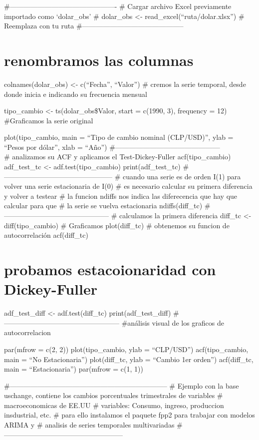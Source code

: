 \documentclass[
]{article}
\begin{document}
\#---------------------------------------------- \# Cargar archivo Excel
previamente importado como `dolar\_obs' \# dolar\_obs \textless-
read\_excel(``ruta/dolar.xlsx'') \# Reemplaza con tu ruta
\#--------------------------------------------

\section{renombramos las columnas}\label{renombramos-las-columnas}

colnames(dolar\_obs) \textless- c(``Fecha'', ``Valor'') \# cremos la
serie temporal, desde donde inicia e indicando su frecuencia mensual

tipo\_cambio \textless- ts(dolar\_obs\$Valor, start = c(1990, 3),
frequency = 12) \#Graficamos la serie original

plot(tipo\_cambio, main = ``Tipo de cambio nominal (CLP/USD)'', ylab =
``Pesos por dólar'', xlab = ``Año'')
\#---------------------------------------------\\
\# analizamos su ACF y aplicamos el Test-Dickey-Fuller acf(tipo\_cambio)
adf\_test\_tc \textless- adf.test(tipo\_cambio) print(adf\_test\_tc)
\#----------------------------------------------- \# cuando una serie es
de orden I(1) para volver una serie estacionaria de I(0) \# es necesario
calcular su primera diferencia y volver a testear \# la funcion ndiffs
nos indica las diferecencia que hay que calcular para que \# la serie se
vuelva estacionaria ndiffs(diff\_tc)
\#--------------------------------------------- \# calculamos la primera
diferencia diff\_tc \textless- diff(tipo\_cambio) \# Graficamos
plot(diff\_tc) \# obtenemos su funcion de autocorrelación acf(diff\_tc)

\section{probamos estacoionaridad con
Dickey-Fuller}\label{probamos-estacoionaridad-con-dickey-fuller}

adf\_test\_diff \textless- adf.test(diff\_tc) print(adf\_test\_diff)
\#-------------------------------------------------- \#análisis visual
de los graficos de autocorrelacion

par(mfrow = c(2, 2)) plot(tipo\_cambio, ylab = ``CLP/USD'')
acf(tipo\_cambio, main = ``No Estacionaria'') plot(diff\_tc, ylab =
``Cambio 1er orden'') acf(diff\_tc, main = ``Estacionaria'') par(mfrow =
c(1, 1))

\#--------------------------------------------------------------------
\# Ejemplo con la base uschange, contiene los cambios porcentuales
trimestrales de variables \# macroeconomicas de EE.UU \# variables:
Consumo, ingreso, produccion insdustrial, etc. \# para ello instalamos
el paquete fpp2 para trabajar con modelos ARIMA y \# analisis de series
temporales multivariadas
\#---------------------------------------------------
\end{document}
